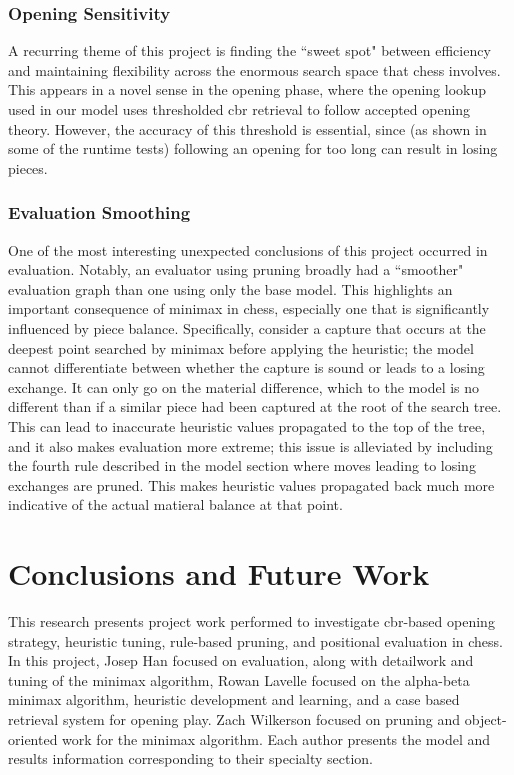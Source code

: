 \documentclass[letterpaper]{article}
\begin{document}
\subsubsection{Opening Sensitivity}
A recurring theme of this project is finding the ``sweet spot" between efficiency and maintaining flexibility across the enormous search space that chess involves.  This appears in a novel sense in the opening phase, where the opening lookup used in our model uses thresholded \acrshort{cbr} retrieval to follow accepted opening theory.  However, the accuracy of this threshold is essential, since (as shown in some of  the runtime tests) following an opening for too long can result in losing pieces.

\subsubsection{Evaluation Smoothing}
One of the most interesting unexpected conclusions of this project occurred in evaluation.  Notably, an evaluator using pruning broadly had a ``smoother" evaluation graph than one using only the base model.  This highlights an important consequence of minimax in chess, especially one that is significantly influenced by piece balance.  Specifically, consider a capture that occurs at the deepest point searched by minimax before applying the heuristic; the model cannot differentiate between whether the capture is sound or leads to a losing exchange.  It can only go on the material difference, which to the model is no different than if a similar piece had been captured at the root of the search tree.  This can lead to inaccurate heuristic values propagated to the top of the tree, and it also makes evaluation more extreme; this issue is alleviated by including the fourth rule described in the model section where moves leading to losing exchanges are pruned.  This makes heuristic values propagated back much more indicative of the actual matieral balance at that point.

\section{Conclusions and Future Work}
This research presents project work performed to investigate \acrshort{cbr}-based opening strategy, heuristic tuning, rule-based pruning, and positional evaluation in chess.  In this project, Josep Han focused on evaluation, along with detailwork and tuning of the minimax algorithm, Rowan Lavelle focused on the alpha-beta minimax algorithm, heuristic development and learning, and a case based retrieval system for opening play. Zach Wilkerson focused on pruning and object-oriented work for the minimax algorithm.  Each author presents the model and results information corresponding to their specialty section.
\end{document}
